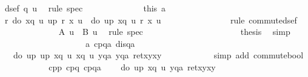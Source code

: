 \begin{isabellebody}
\ {\isachardoublequote}dsef\ {\isacharparenleft}q\ u{\isacharparenright}{\isachardoublequote}\ \isamarkupfalse%
\ {\isacharparenleft}rule\ spec{\isacharparenright}\isanewline
\ \ \ \ \ \ \ \ \ \ \ \ \isamarkupfalse%
\ this\ a{}\ \isamarkupfalse%
\ {\isachardoublequote}{\isasymforall}r{\isachardot}\ do\ {\isacharbraceleft}x{\isasymleftarrow}q\ u{\isacharsemicolon}\ u{\isacharprime}{\isasymleftarrow}p{\isacharsemicolon}\ r\ x\ u{\isacharprime}{\isacharbraceright}\ {\isacharequal}\ do\ {\isacharbraceleft}u{\isacharprime}{\isasymleftarrow}p{\isacharsemicolon}\ x{\isasymleftarrow}q\ u{\isacharsemicolon}\ r\ x\ u{\isacharprime}{\isacharbraceright}{\isachardoublequote}\isanewline
\ \ \ \ \ \ \ \ \ \ \ \ \ \ \isamarkupfalse%
\ {\isacharparenleft}rule\ commute{\isacharunderscore}dsef{\isacharparenright}\isanewline
\ \ \ \ \ \ \ \ \ \ \ \ \isamarkupfalse%
\ {\isachardoublequote}{\isacharquery}A\ u\ {\isacharequal}\ {\isacharquery}B\ u{\isachardoublequote}\ \isamarkupfalse%
\ {\isacharparenleft}rule\ spec{\isacharparenright}\isanewline
\ \ \ \ \ \ \ \ \ \ \isamarkupfalse%
\isanewline
\ \ \ \ \ \ \ \ \ \ \isamarkupfalse%
\ {\isacharquery}thesis\ \isamarkupfalse%
\ simp\isanewline
\ \ \ \ \ \ \ \ \isamarkupfalse%
\isanewline
\ \ \ \ \ \ \ \ \isamarkupfalse%
\ \isamarkupfalse%
\ a{}\ cpqa\ disqa\ \isanewline
\ \ \ \ \ \ \ \ \isamarkupfalse%
\ {\isachardoublequote}{\isasymdots}\ {\isacharequal}\ do\ {\isacharbraceleft}u{\isasymleftarrow}p{\isacharsemicolon}\ u{\isacharprime}{\isasymleftarrow}p{\isacharsemicolon}\ x{\isasymleftarrow}q\ u{\isacharsemicolon}\ x{\isacharprime}{\isasymleftarrow}q\ u{\isacharprime}{\isacharsemicolon}\ y{\isasymleftarrow}qa{\isacharsemicolon}\ y{\isacharprime}{\isasymleftarrow}qa{\isacharsemicolon}\ ret{\isacharparenleft}{\isacharparenleft}x{\isacharcomma}y{\isacharparenright}{\isacharcomma}{\isacharparenleft}x{\isacharprime}{\isacharcomma}y{\isacharprime}{\isacharparenright}{\isacharparenright}{\isacharbraceright}{\isachardoublequote}\isanewline
\ \ \ \ \ \ \ \ \ \ \isamarkupfalse%
\ {\isacharparenleft}simp\ add{\isacharcolon}\ commute{\isacharunderscore}bool{\isacharparenright}\isanewline
\ \ \ \ \ \ \ \ \isamarkupfalse%
\ \isamarkupfalse%
\ cpp\ cpq\ cpqa\ \isamarkupfalse%
\ {\isachardoublequote}{\isasymdots}\ {\isacharequal}\ do\ {\isacharbraceleft}u{\isasymleftarrow}p{\isacharsemicolon}\ x{\isasymleftarrow}q\ u{\isacharsemicolon}\ y{\isasymleftarrow}qa{\isacharsemicolon}\ ret{\isacharparenleft}{\isacharparenleft}x{\isacharcomma}y{\isacharparenright}{\isacharcomma}{\isacharparenleft}x{\isacharcomma}y{\isacharparenright}{\isacharparenright}{\isacharbraceright}{\isachardoublequote}\isanewline

\end{isabellebody}
